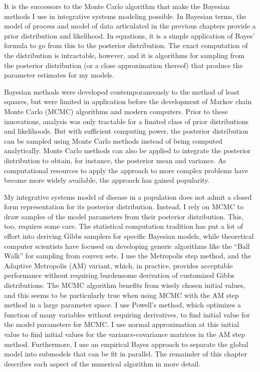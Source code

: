 It is the successors to the Monte Carlo algorithm that make the
Bayesian methods I use in integrative systems modeling possible.  In
Bayesian terms, the model of process and model of data articulated in
the previous chapters provide a prior distribution and
likelihood.  In equations, it is a simple application of Bayes'
formula to go from this to the posterior distribution.  The exact
computation of the distribution is intractable, however, and it is
algorithms for sampling from the posterior distribution (or a close
approximation thereof) that produce the parameter estimates for my
models.

Bayesian methods were developed contemporaneously to the method of
least squares, but were limited in application before the development
of Markov chain Monte Carlo (MCMC) algorithms and modern computers.
Prior to these innovations, analysis was only tractable for a limited
class of prior distributions and likelihoods. But with sufficient
computing power, the posterior distribution can be sampled using Monte
Carlo methods instead of being computed
analytically.\cite{gelman_bayesian_2003} Monte Carlo methods can also
be applied to integrate the posterior distribution to obtain, for
instance, the posterior mean and variance. As computational resources
to apply the approach to more complex problems have become more widely
available, the approach has gained popularity.\cite{tanner_em_2010}

My integrative systems model of disease in a population does not admit
a closed form representation for its posterior distribution.  Instead,
I rely on MCMC to draw samples of the model parameters from their
posterior distribution.  This, too, requires some care.  The
statistical computation tradition has put a lot of effort into
deriving Gibbs samplers for specific Bayesian models, while
theoretical computer scientists have focused on developing generic
algorithms like the ``Ball Walk'' for sampling from convex sets.  I
use the Metropolis step method, and the Adaptive Metropolis (AM)
variant,\cite{haario_adaptive_2001} which, in practice, provides
acceptable performance without requiring burdensome derivation of
customized Gibbs distributions. The MCMC algorithm benefits from
wisely chosen initial values, and this seems to be particularly true
when using MCMC with the AM step method in a large parameter space. I
use Powell's method, which optimizes a function of many variables
without requiring derivatives, to find initial value for the model
parameters for MCMC.\cite{powell_efficient_1964}  I use normal approximation at this initial
value to find initial values for the variance-covariance matrices in
the AM step method.  Furthermore, I use an empirical Bayes
approach to separate the global model into submodels that can be fit
in parallel.  The remainder of this chapter describes each aspect of
the numerical algorithm in more detail.

